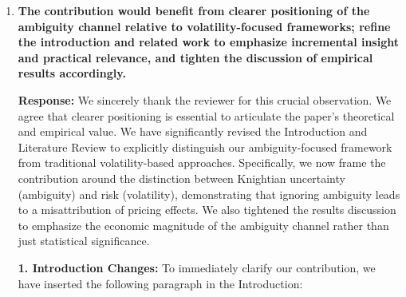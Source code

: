 \documentclass[12pt]{article}
\begin{document}
\begin{enumerate}
\begin{responsebox}
    \textbf{3. Mechanism Discussion:}
    We will add descriptive evidence:

    \textit{``The ambiguity cushion for SOEs likely operates through three channels: (1) Explicit government guarantees on debt obligations reduce default uncertainty; (2) Policy support during crises (e.g., targeted lending, tax relief) narrows outcome distributions; (3) Access to state-controlled financing creates a lower bound on firm value. Evidence from the 2020 COVID crisis confirms that SOEs benefited from stronger implicit guarantees, resulting in significantly more stable credit spreads and preferential access to liquidity support compared to non-SOEs \citep{Geng2024}.''}

    \textbf{4. Alternative Explanations:}
    We will test and rule out size effects by adding:

    \textit{``Results hold after controlling for firm size and interaction terms. The SOE buffer persists within size quintiles, suggesting it's not merely a scale effect.''}
    \end{responsebox}

    \vspace{0.5cm}

    \item \textbf{The contribution would benefit from clearer positioning of the ambiguity channel relative to volatility-focused frameworks; refine the introduction and related work to emphasize incremental insight and practical relevance, and tighten the discussion of empirical results accordingly.}

    \begin{responsebox}
    \textbf{Response:} We sincerely thank the reviewer for this crucial observation. We agree that clearer positioning is essential to articulate the paper's theoretical and empirical value. We have significantly revised the Introduction and Literature Review to explicitly distinguish our ambiguity-focused framework from traditional volatility-based approaches. Specifically, we now frame the contribution around the distinction between Knightian uncertainty (ambiguity) and risk (volatility), demonstrating that ignoring ambiguity leads to a misattribution of pricing effects. We also tightened the results discussion to emphasize the economic magnitude of the ambiguity channel rather than just statistical significance.

    \textbf{1. Introduction Changes:}
    To immediately clarify our contribution, we have inserted the following paragraph in the Introduction:


\end{responsebox}
\end{enumerate}
\end{document}
